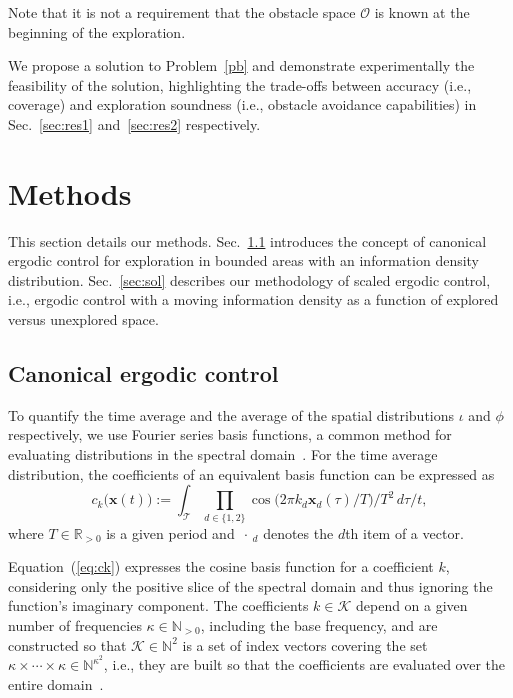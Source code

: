 \documentclass[letterpaper,10pt,conference,twoside]{IEEEtran}
\theoremstyle{definition}
\begin{document}
Note that it is not a requirement that the obstacle space $\mathcal{O}$ is known at the beginning of the exploration.

We propose a solution to Problem~\ref{pb} and demonstrate experimentally the feasibility of the solution, highlighting the trade-offs between accuracy (i.e., coverage) and exploration soundness (i.e., obstacle avoidance capabilities) in Sec.~\ref{sec:res1} and~\ref{sec:res2} respectively.


\section{Methods}\label{sec:meth}
\noindent
This section details our methods. Sec.~\ref{sec:canon} introduces the concept of canonical ergodic control for exploration in bounded areas with an information density distribution. Sec.~\ref{sec:sol} describes our methodology of scaled ergodic control, i.e., ergodic control with a moving information density as a function of explored versus unexplored space.

\subsection{Canonical ergodic control}
\label{sec:canon}
\noindent
To quantify the time average and the average of the spatial distributions $\iota$ and $\phi$ respectively, we use Fourier series basis functions, a common method for evaluating distributions in the spectral domain~\cite{mathew2011metrics}. For the time average distribution, the coefficients of an equivalent basis function can be expressed as
\begin{equation}\label{eq:ck}
  c_k\big(\mathbf{x}(t)\big):=\int_{\mathcal{T}}{\prod_{d\in\{1,2\}}}{\cos{\big(2\pi k_d\mathbf{x}_d(\tau)/T\big)}/T^2}\,d\tau/t,
\end{equation}
where $T\in\mathbb{R}_{>0}$ is a given period and $\,\cdot\,_d$ denotes the $d$th item of a vector.

Equation~(\ref{eq:ck}) expresses the cosine basis function for a coefficient $k$, considering only the positive slice of the spectral domain and thus ignoring the function's imaginary component. The coefficients $k\in\mathcal{K}$ depend on a given number of frequencies $\kappa\in\mathbb{N}_{>0}$, including the base frequency, and are constructed so that $\mathcal{K}\in\mathbb{N}^2$ is a set of index vectors covering the set $\kappa\times\cdots\times\kappa\in\mathbb{N}^{\kappa^2}$, i.e., they are built so that the coefficients are evaluated over the entire domain~\cite{calinon2020mixture}.
\end{document}
